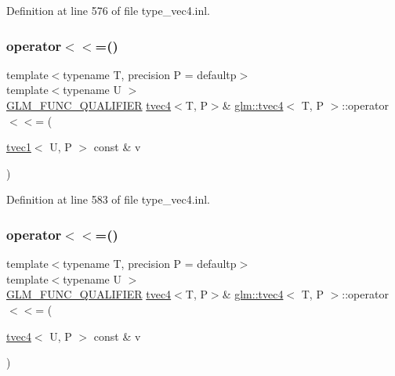 Definition at line 576 of file type\+\_\+vec4.\+inl.

\mbox{\label{structglm_1_1tvec4_ac1b4567b5baff2c335edef8d30e73a80}} 
\subsubsection{\texorpdfstring{operator$<$$<$=()}{operator<<=()}\hspace{0.1cm}{\footnotesize\ttfamily [5/6]}}
{\footnotesize\ttfamily template$<$typename T, precision P = defaultp$>$ \\
template$<$typename U $>$ \\
\mbox{\hyperlink{setup_8hpp_a33fdea6f91c5f834105f7415e2a64407}{G\+L\+M\+\_\+\+F\+U\+N\+C\+\_\+\+Q\+U\+A\+L\+I\+F\+I\+ER}} \mbox{\hyperlink{structglm_1_1tvec4}{tvec4}}$<$T, P$>$\& \mbox{\hyperlink{structglm_1_1tvec4}{glm\+::tvec4}}$<$ T, P $>$\+::operator$<$$<$= (\begin{DoxyParamCaption}\item[{\mbox{\hyperlink{structglm_1_1tvec1}{tvec1}}$<$ U, P $>$ const \&}]{v }\end{DoxyParamCaption})}



Definition at line 583 of file type\+\_\+vec4.\+inl.

\mbox{\label{structglm_1_1tvec4_ab39a99917d9c3a7b93c1cf5cbfa93025}} 
\subsubsection{\texorpdfstring{operator$<$$<$=()}{operator<<=()}\hspace{0.1cm}{\footnotesize\ttfamily [6/6]}}
{\footnotesize\ttfamily template$<$typename T, precision P = defaultp$>$ \\
template$<$typename U $>$ \\
\mbox{\hyperlink{setup_8hpp_a33fdea6f91c5f834105f7415e2a64407}{G\+L\+M\+\_\+\+F\+U\+N\+C\+\_\+\+Q\+U\+A\+L\+I\+F\+I\+ER}} \mbox{\hyperlink{structglm_1_1tvec4}{tvec4}}$<$T, P$>$\& \mbox{\hyperlink{structglm_1_1tvec4}{glm\+::tvec4}}$<$ T, P $>$\+::operator$<$$<$= (\begin{DoxyParamCaption}\item[{\mbox{\hyperlink{structglm_1_1tvec4}{tvec4}}$<$ U, P $>$ const \&}]{v }\end{DoxyParamCaption})}



